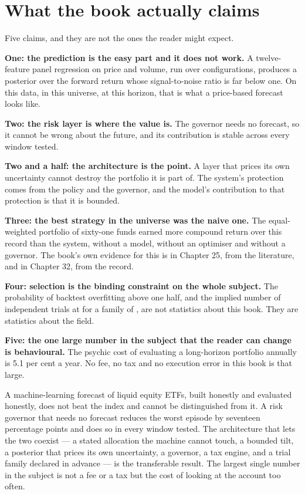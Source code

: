 \section{What the book actually claims}

Five claims, and they are not the ones the reader might expect.

\textbf{One: the prediction is the easy part and it does not work.} A
twelve-feature panel regression on price and volume, run over
\numModelConfigs{} configurations, produces a posterior over the forward
return whose signal-to-noise ratio is far below one. On this data, in
this universe, at this horizon, that is what a price-based forecast
looks like.

\textbf{Two: the risk layer is where the value is.} The governor needs no
forecast, so it cannot be wrong about the future, and its contribution is
stable across every window tested.

\textbf{Two and a half: the architecture is the point.} A layer that
prices its own uncertainty cannot destroy the portfolio it is part of.
The system's protection comes from the policy and the governor, and the
model's contribution to that protection is that it is bounded.

\textbf{Three: the best strategy in the universe was the naive one.} The
equal-weighted portfolio of sixty-one funds earned more compound return
over this record than the system, without a model, without an optimiser
and without a governor. The book's own evidence for this is in Chapter
25, from the literature, and in Chapter 32, from the record.

\textbf{Four: selection is the binding constraint on the whole subject.}
The probability of backtest overfitting above one half, and the implied
number of independent trials at \numImpliedTrials{} for a family of
\numFamilySize{}, are not statistics about this book. They are statistics
about the field.

\textbf{Five: the one large number in the subject that the reader can
change is behavioural.} The psychic cost of evaluating a long-horizon
portfolio annually is 5.1 per cent a year. No fee, no tax and no
execution error in this book is that large.

\begin{takeaway}
A machine-learning forecast of liquid equity ETFs, built honestly and
evaluated honestly, does not beat the index and cannot be distinguished
from it. A risk governor that needs no forecast reduces the worst episode
by seventeen percentage points and does so in every window tested. The
architecture that lets the two coexist --- a stated allocation the
machine cannot touch, a bounded tilt, a posterior that prices its own
uncertainty, a governor, a tax engine, and a trial family declared in
advance --- is the transferable result. The largest single number in the
subject is not a fee or a tax but the cost of looking at the account too
often.
\end{takeaway}


